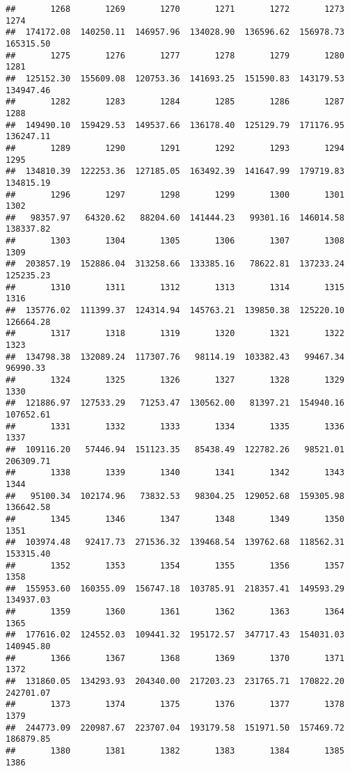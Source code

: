 \documentclass[
]{article}
\begin{document}
\begin{verbatim}
##       1268       1269       1270       1271       1272       1273       1274 
##  174172.08  140250.11  146957.96  134028.90  136596.62  156978.73  165315.50 
##       1275       1276       1277       1278       1279       1280       1281 
##  125152.30  155609.08  120753.36  141693.25  151590.83  143179.53  134947.46 
##       1282       1283       1284       1285       1286       1287       1288 
##  149490.10  159429.53  149537.66  136178.40  125129.79  171176.95  136247.11 
##       1289       1290       1291       1292       1293       1294       1295 
##  134810.39  122253.36  127185.05  163492.39  141647.99  179719.83  134815.19 
##       1296       1297       1298       1299       1300       1301       1302 
##   98357.97   64320.62   88204.60  141444.23   99301.16  146014.58  138337.82 
##       1303       1304       1305       1306       1307       1308       1309 
##  203857.19  152886.04  313258.66  133385.16   78622.81  137233.24  125235.23 
##       1310       1311       1312       1313       1314       1315       1316 
##  135776.02  111399.37  124314.94  145763.21  139850.38  125220.10  126664.28 
##       1317       1318       1319       1320       1321       1322       1323 
##  134798.38  132089.24  117307.76   98114.19  103382.43   99467.34   96990.33 
##       1324       1325       1326       1327       1328       1329       1330 
##  121886.97  127533.29   71253.47  130562.00   81397.21  154940.16  107652.61 
##       1331       1332       1333       1334       1335       1336       1337 
##  109116.20   57446.94  151123.35   85438.49  122782.26   98521.01  206309.71 
##       1338       1339       1340       1341       1342       1343       1344 
##   95100.34  102174.96   73832.53   98304.25  129052.68  159305.98  136642.58 
##       1345       1346       1347       1348       1349       1350       1351 
##  103974.48   92417.73  271536.32  139468.54  139762.68  118562.31  153315.40 
##       1352       1353       1354       1355       1356       1357       1358 
##  155953.60  160355.09  156747.18  103785.91  218357.41  149593.29  134937.03 
##       1359       1360       1361       1362       1363       1364       1365 
##  177616.02  124552.03  109441.32  195172.57  347717.43  154031.03  140945.80 
##       1366       1367       1368       1369       1370       1371       1372 
##  131860.05  134293.93  204340.00  217203.23  231765.71  170822.20  242701.07 
##       1373       1374       1375       1376       1377       1378       1379 
##  244773.09  220987.67  223707.04  193179.58  151971.50  157469.72  186879.85 
##       1380       1381       1382       1383       1384       1385       1386 

\end{verbatim}
\end{document}
